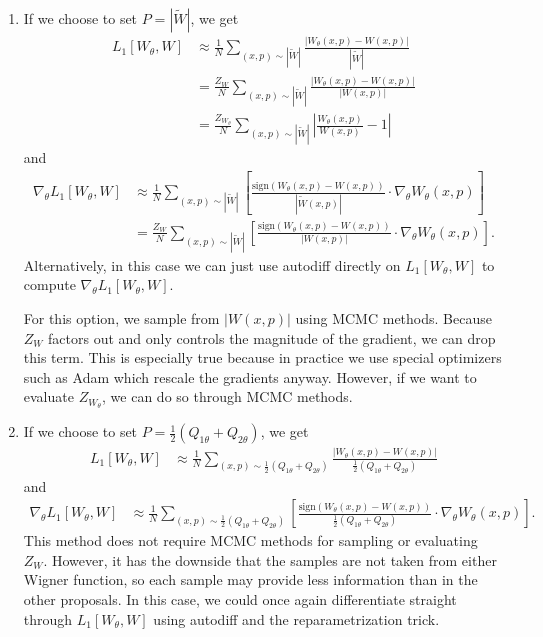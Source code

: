 \documentclass{article}
\begin{document}
\begin{enumerate}
    \item If we choose to set $P = |\widetilde{W}|$, we get \begin{align*}
        L_1[W_\theta,W] &\approx \frac{1}{N}\sum_{(x,p)\sim |\widetilde{W}|} \frac{|W_\theta(x,p) - W(x,p)|}{|\widetilde{W}|}\\
        &= \frac{Z_{W}}{N}\sum_{(x,p)\sim |\widetilde{W}|} \frac{|W_\theta(x,p) - W(x,p)|}{|W(x,p)|}\\
        &= \frac{Z_{W_\theta}}{N}\sum_{(x,p)\sim |\widetilde{W}|} \left|\frac{W_\theta (x,p)}{W(x,p)} - 1\right|
    \end{align*} and \begin{align*}
        \nabla_\theta L_1[W_\theta,W] &\approx \frac{1}{N}\sum_{(x,p)\sim |\widetilde{W}|}\left[\frac{\text{sign}(W_\theta(x,p) - W(x,p))}{|\widetilde{W}(x,p)|}\cdot \nabla_\theta W_\theta(x,p)\right]\\
        &= \frac{Z_{W}}{N}\sum_{(x,p)\sim |\widetilde{W}|}\left[\frac{\text{sign}(W_\theta(x,p) - W(x,p))}{|W(x,p)|}\cdot \nabla_\theta W_\theta(x,p)\right].
    \end{align*} Alternatively, in this case we can just use autodiff directly on $L_1[W_\theta,W]$ to compute $\nabla_\theta L_1[W_\theta,W]$. 
    
    For this option, we sample from $|W(x,p)|$ using MCMC methods. Because $Z_{W}$ factors out and only controls the magnitude of the gradient, we can drop this term. This is especially true because in practice we use special optimizers such as Adam which rescale the gradients anyway. However, if we want to evaluate $Z_{W_\theta}$, we can do so through MCMC methods.

    \item If we choose to set $P = \frac{1}{2}(Q_{1\theta}+Q_{2\theta})$, we get \begin{align*}
        L_1[W_\theta,W] &\approx \frac{1}{N}\sum_{(x,p)\sim \frac{1}{2}(Q_{1\theta}+Q_{2\theta})} \frac{|W_\theta(x,p) - W(x,p)|}{\frac{1}{2}(Q_{1\theta}+Q_{2\theta})}
    \end{align*} and \begin{align*}
        \nabla_\theta L_1[W_\theta,W] &\approx \frac{1}{N}\sum_{(x,p)\sim \frac{1}{2}(Q_{1\theta}+Q_{2\theta})}\left[\frac{\text{sign}(W_\theta(x,p) - W(x,p))}{\frac{1}{2}(Q_{1\theta}+Q_{2\theta})}\cdot \nabla_\theta W_\theta(x,p)\right].
    \end{align*} This method does not require MCMC methods for sampling or evaluating $Z_W.$ However, it has the downside that the samples are not taken from either Wigner function, so each sample may provide less information than in the other proposals. In this case, we could once again differentiate straight through $L_1[W_\theta,W]$ using autodiff and the reparametrization trick.
\end{enumerate}
\end{document}
